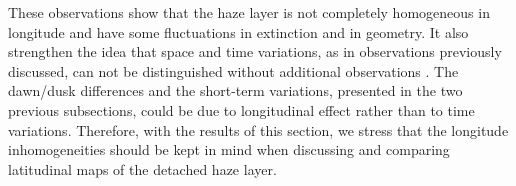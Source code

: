 These observations show that the haze layer is not completely homogeneous in longitude and have some
fluctuations in extinction and in geometry.
It also strengthen the idea that space and time variations, as in observations previously discussed,
can not be distinguished without additional observations .
The dawn/dusk differences and the short-term variations,
presented in the two previous subsections, could be due to longitudinal effect rather than to time variations.
Therefore, with the results of this section, we stress that the longitude inhomogeneities should be kept
in mind  when discussing and comparing latitudinal maps of the detached haze layer.